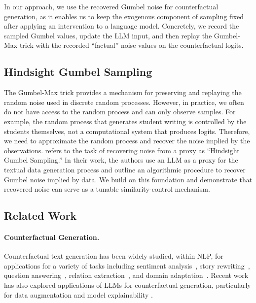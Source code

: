 \documentclass[11pt]{article}
\newcommand{\mh}[1]{\textcolor{teal}{\bf [Hunter: #1]}}
\begin{document}
In our approach, we use the recovered Gumbel noise for counterfactual generation, as it enables us to keep the exogenous component of sampling fixed after applying an intervention to a language model. Concretely, we record the sampled Gumbel values, update the LLM input, and then replay the Gumbel-Max trick with the recorded ``factual'' noise values on the counterfactual logits.


\subsection{Hindsight Gumbel Sampling}

The Gumbel-Max trick provides a mechanism for preserving and replaying the random noise used in discrete random processes. However, in practice, we often do not have access to the random process and can only observe samples. For example, the random process that generates student writing is controlled by the students themselves, not a computational system that produces logits. Therefore, we need to approximate the random process and recover the noise implied by the observations. \citet{ravfogel2025gumbel} refers to the task of recovering noise from a proxy as ``Hindsight Gumbel Sampling.'' In their work, the authors use an LLM as a proxy for the textual data generation process and outline an algorithmic procedure to recover Gumbel noise implied by data. We build on this foundation and demonstrate that recovered noise can serve as a tunable similarity-control mechanism. 

\subsection{Related Work}

\paragraph{Counterfactual Generation.} Counterfactual text generation has been widely studied, within NLP, for applications for a variety of tasks including sentiment analysis~\cite{kaushik_learning_2020, madaan_generate_2021}, story rewriting~\cite{chen_unsupervised_2022}, question answering~\cite{sachdeva_catfood_2024, paranjape_retrieval-guided_2022}, relation extraction~\cite{miao_episodic_2024}, and domain adaptation~\cite{calderon_docogen_2022, wu_polyjuice_2021}. Recent work has also explored applications of LLMs for counterfactual generation, particularly for data augmentation and model explainability \cite{goethals_what_2025, zhang_dually_2025,wang_fitcf_2025,gat_faithful_2023, wen_autocad_2022}.
\end{document}
